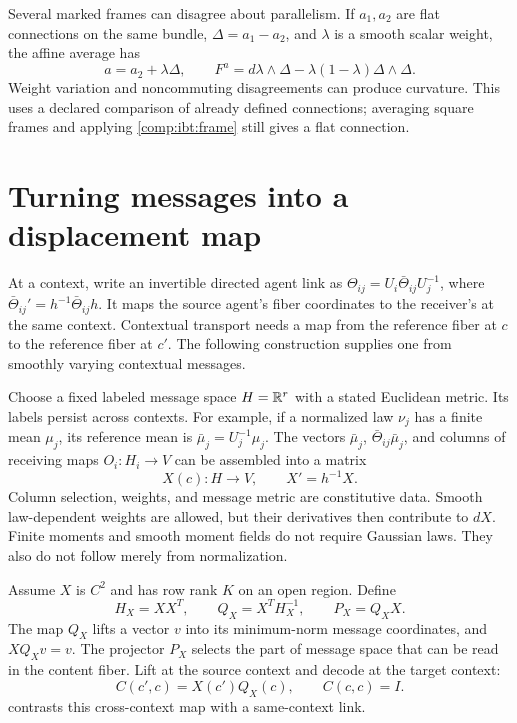 Several marked frames can disagree about parallelism. If $a_1,a_2$ are flat connections on the same bundle, $\Delta=a_1-a_2$, and $\lambda$ is a smooth scalar weight, the affine average has
\begin{equation}
a=a_2+\lambda\Delta,\qquad
F^a=d\lambda\wedge\Delta-\lambda(1-\lambda)\Delta\wedge\Delta.
\end{equation}
Weight variation and noncommuting disagreements can produce curvature. This uses a declared comparison of already defined connections; averaging square frames and applying \cref{comp:ibt:frame} still gives a flat connection.

\section{Turning messages into a displacement map}

At a context, write an invertible directed agent link as $\Theta_{ij}=U_i\bar\Theta_{ij}U_j^{-1}$, where $\bar\Theta_{ij}'=h^{-1}\bar\Theta_{ij}h$. It maps the source agent's fiber coordinates to the receiver's at the same context. Contextual transport needs a map from the reference fiber at $c$ to the reference fiber at $c'$. The following construction supplies one from smoothly varying contextual messages.

Choose a fixed labeled message space $H=\mathbb R^r$ with a stated Euclidean metric. Its labels persist across contexts. For example, if a normalized law $\nu_j$ has a finite mean $\mu_j$, its reference mean is $\bar \mu_j=U_j^{-1}\mu_j$. The vectors $\bar \mu_j$, $\bar\Theta_{ij}\bar \mu_j$, and columns of receiving maps $O_i:H_i\to V$ can be assembled into a matrix
\begin{equation}
X(c):H\longrightarrow V,\qquad X'=h^{-1}X.
\end{equation}
Column selection, weights, and message metric are constitutive data. Smooth law-dependent weights are allowed, but their derivatives then contribute to $dX$. Finite moments and smooth moment fields do not require Gaussian laws. They also do not follow merely from normalization.

Assume $X$ is $C^2$ and has row rank $K$ on an open region. Define
\begin{equation}
H_X=XX^T,\qquad Q_X=X^T H_X^{-1},\qquad P_X=Q_XX.
\label{comp:ibt:inverse}
\end{equation}
The map $Q_X$ lifts a vector $v$ into its minimum-norm message coordinates, and $XQ_Xv=v$. The projector $P_X$ selects the part of message space that can be read in the content fiber. Lift at the source context and decode at the target context:
\begin{equation}
C(c',c)=X(c')Q_X(c),\qquad C(c,c)=I.
\label{comp:ibt:cross}
\end{equation}
 contrasts this cross-context map with a same-context link.

